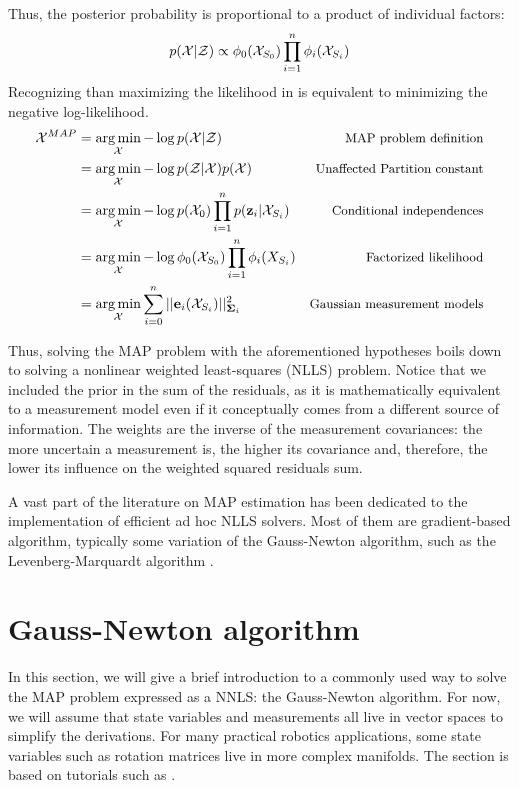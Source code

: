 Thus, the posterior probability is proportional to a product of individual factors:
%
\begin{equation}
    p(\mathcal{X} | \mathcal{Z}) \propto \phi_0(\mathcal{X}_{S_0}) \prod_{i=1}^{n} \phi_i(\mathcal{X}_{S_i}) 
    \label{eq:likelihood_factorization}
\end{equation}
%
Recognizing than maximizing the likelihood in  is equivalent to minimizing the negative log-likelihood.
%
\begin{align}
    \mathcal{X}^{MAP} 
    &= \operatorname*{arg\,min}_{\mathcal{X}} - \log p(\mathcal{X} | \mathcal{Z}) &\text{\small MAP problem definition}
    \\
    &= \operatorname*{arg\,min}_{\mathcal{X}} - \log p(\mathcal{Z} | \mathcal{X}) p(\mathcal{X}) &\text{\small Unaffected Partition constant}
    \\
    &= \operatorname*{arg\,min}_{\mathcal{X}} - \log p(\mathcal{X}_0) \prod_{i=1}^{n} p({\bf z}_i | \mathcal{X}_{S_i})  &\text{\small Conditional independences}
    \\
    &= \operatorname*{arg\,min}_{\mathcal{X}} - \log \phi_0(\mathcal{X}_{S_0}) \prod_{i=1}^{n} \phi_i(X_{S_i}) &\text{\small Factorized likelihood}
    \\
    &= \operatorname*{arg\,min}_{\mathcal{X}}  \sum_{i=0}^{n} ||{\bf e}_i(\mathcal{X}_{S_i})||_{{\bm \Sigma}_i}^2  &\text{\small Gaussian measurement models}
\end{align}

Thus, solving the MAP problem with the aforementioned hypotheses boils down to solving a nonlinear weighted least-squares (NLLS) problem.
Notice that we included the prior in the sum of the residuals, as it is mathematically equivalent to a measurement model even if it conceptually
comes from a different source of information. 
The weights are the inverse of the measurement covariances: the more uncertain a measurement is, the higher its covariance and, therefore, the lower its influence
on the weighted squared residuals sum. 

A vast part of the literature on MAP estimation has been dedicated to the implementation of efficient ad hoc NLLS solvers. Most of them are 
gradient-based algorithm, typically some variation of the Gauss-Newton algorithm, such as the Levenberg-Marquardt algorithm \cite{boyd2004convex}.





%
%
%
%
%
%
%
\section{Gauss-Newton algorithm}
In this section, we will give a brief introduction to a commonly used way to solve the MAP problem expressed as a NNLS: the Gauss-Newton algorithm.
For now, we will assume that state variables and measurements all live in vector spaces to simplify the derivations. For many practical robotics applications,
some state variables such as rotation matrices live in more complex manifolds. The section is based on tutorials such as \cite{dellaert2017factor,sola2017course}. 

